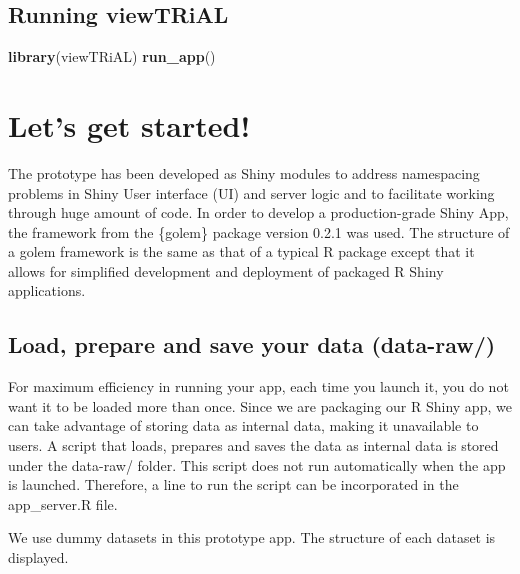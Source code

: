 \documentclass[]{article}
\newenvironment{Shaded}{\begin{snugshade}}{\end{snugshade}}
\newcommand{\KeywordTok}[1]{\textcolor[rgb]{0.13,0.29,0.53}{\textbf{#1}}}
\newcommand{\NormalTok}[1]{#1}
\begin{document}
\hypertarget{running-viewtrial}{%
\subsection{Running viewTRiAL}\label{running-viewtrial}}

\begin{Shaded}
\begin{Highlighting}[]

\KeywordTok{library}\NormalTok{(viewTRiAL)}
\KeywordTok{run_app}\NormalTok{()}
\end{Highlighting}
\end{Shaded}

\hypertarget{lets-get-started}{%
\section{\texorpdfstring{\textbf{Let's get
started!}}{Let's get started!}}\label{lets-get-started}}

The prototype has been developed as Shiny modules to address namespacing
problems in Shiny User interface (UI) and server logic and to facilitate
working through huge amount of code. In order to develop a
production-grade Shiny App, the framework from the \{golem\} package
version 0.2.1 was used. The structure of a golem framework is the same
as that of a typical R package except that it allows for simplified
development and deployment of packaged R Shiny applications.

\hypertarget{load-prepare-and-save-your-data-data-raw}{%
\subsection{\texorpdfstring{\textbf{Load, prepare and save your data}
(data-raw/)}{Load, prepare and save your data (data-raw/)}}\label{load-prepare-and-save-your-data-data-raw}}

For maximum efficiency in running your app, each time you launch it, you
do not want it to be loaded more than once. Since we are packaging our R
Shiny app, we can take advantage of storing data as internal data,
making it unavailable to users. A script that loads, prepares and saves
the data as internal data is stored under the data-raw/ folder. This
script does not run automatically when the app is launched. Therefore, a
line to run the script can be incorporated in the app\_server.R file.

We use dummy datasets in this prototype app. The structure of each
dataset is displayed.
\end{document}
